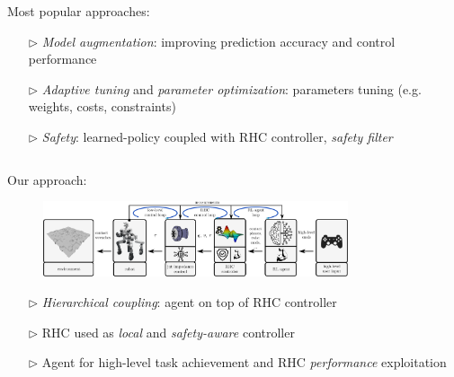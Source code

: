 \vskip0.5cm
\begin{columns}[t]
	\begin{Large}
	\begin{column}{0.01\textwidth}
	\end{column}
	\begin{column}{0.22\textwidth}
		Most popular approaches:\vskip0.5cm
		\begin{itemize}
			\item[$\rhd$] \textit{Model augmentation}: improving prediction accuracy and control performance\vskip0.7cm
			\item[$\rhd$] \textit{Adaptive tuning} and \textit{parameter optimization}: parameters tuning (e.g. weights, costs, constraints)\vskip0.7cm
			\item[$\rhd$] \textit{Safety}: learned-policy coupled with RHC controller, \textit{safety filter}\vskip0.7cm
		\end{itemize}
	\end{column}
	\begin{column}{0.77\textwidth}
		Our approach:
		\begin{figure}[h]
			\includegraphics[width=0.8\textwidth]{docs/imgs/approach.png}
		\end{figure}
		\begin{itemize}
			\item[$\rhd$] \textit{Hierarchical coupling}: agent on top of RHC controller\vskip0.2cm
			\item[$\rhd$] RHC used as \textit{local} and \textit{safety-aware} controller\vskip0.2cm
			\item[$\rhd$] Agent for high-level task achievement and RHC \textit{performance} exploitation
		\end{itemize}
	\end{column}
	\end{Large}
\end{columns}
